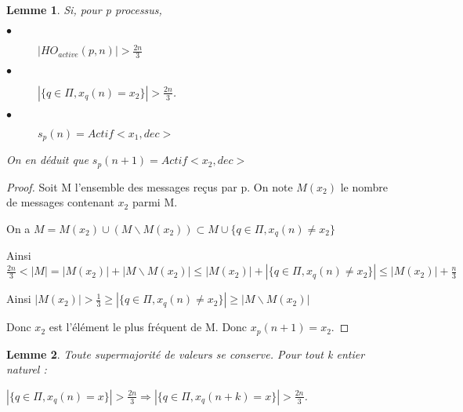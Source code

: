 \documentclass{article}
\newtheorem{lemma}{Lemme}
\begin{document}
\begin{lemma}

Si, pour p processus,

\begin{description}

\item[$\bullet$] $| HO_{active} (p,n) | > \frac{2n}{3}$
\item[$\bullet$] $| \{ q \in \Pi , x_q(n) = x_2 \} | > \frac{2n}{3}$.
\item[$\bullet$] $s_p(n) = Actif <x_1, dec>$

\end{description}

On en déduit que $s_p(n+1) = Actif <x_2, dec>$

\end{lemma}

\begin{proof}

Soit M l'ensemble des messages reçus par p. On note $M(x_2)$ le nombre de messages contenant $x_2$ parmi M.

On a $M = M(x_2) \cup (M \backslash M(x_2) ) \subset M \cup \{ q \in \Pi , x_q(n) \neq x_2 \} $

\vspace{0.4cm}

Ainsi $\frac{2n}{3} < | M | = | M(x_2) | + | M \backslash M(x_2) | \leq | M(x_2) | + | \{ q \in \Pi , x_q(n) \neq x_2 \} | \leq | M(x_2) | +  \frac{n}{3}$

\vspace{0.4cm}

Ainsi  $| M(x_2) | > \frac{1}{3} \geq | \{ q \in \Pi , x_q(n) \neq x_2 \} | \geq | M \backslash M(x_2) |$

Donc $x_2$ est l'élément le plus fréquent de M. Donc $x_p(n+1) = x_2$.

\end{proof}

\begin{lemma}

Toute supermajorité de valeurs se conserve. Pour tout k entier naturel : 

$| \{ q \in \Pi , x_q(n) = x \} | > \frac{2n}{3} \Rightarrow | \{ q \in \Pi , x_q(n+k) = x \} | > \frac{2n}{3}$.

\end{lemma}
\end{document}

